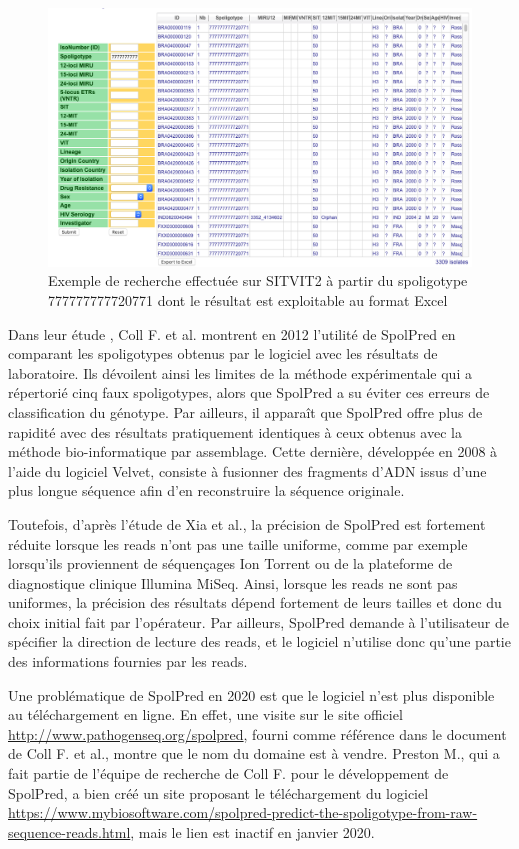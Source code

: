 \documentclass[twoside,a4paper,11pt,frenchb,openany]{report}
\begin{document}
\begin{figure}[h!]
\centering
\includegraphics[scale=0.44]{spol.png}
\caption{Exemple de recherche effectuée sur SITVIT2 à partir du spoligotype 777777777720771 dont le résultat est exploitable au format Excel}
\end{figure}

Dans leur étude \cite{coll}, Coll F. et al. montrent en 2012 l'utilité de SpolPred en comparant les spoligotypes obtenus par le logiciel avec les résultats de laboratoire. Ils dévoilent ainsi les limites de la méthode expérimentale qui a répertorié cinq faux spoligotypes, alors que SpolPred a su éviter ces erreurs de classification du génotype. Par ailleurs, il apparaît que SpolPred offre plus de rapidité avec des résultats pratiquement identiques à ceux obtenus avec la méthode bio-informatique par assemblage. Cette dernière, développée en 2008 à l'aide du logiciel Velvet, consiste à fusionner des fragments d'ADN issus d'une plus longue séquence afin d'en reconstruire la séquence originale.

Toutefois, d'après l'étude de Xia et al.\cite{xia}, la précision de SpolPred est fortement réduite lorsque les reads n'ont pas une taille uniforme, comme par exemple lorsqu'ils proviennent de séquençages Ion Torrent ou de la plateforme de diagnostique clinique Illumina MiSeq. Ainsi, lorsque les reads ne sont pas uniformes, la précision des résultats dépend fortement de leurs tailles et donc du choix initial fait par l'opérateur. Par ailleurs, SpolPred demande à l'utilisateur de spécifier la direction de lecture des reads, et le logiciel n'utilise donc qu'une partie des informations fournies par les reads.

Une problématique de SpolPred en 2020 est que le logiciel n'est plus disponible au téléchargement en ligne. En effet, une visite sur le site officiel \url{http://www.pathogenseq.org/spolpred}, fourni comme référence dans le document \cite{coll} de Coll F. et al., montre que le nom du domaine est à vendre. Preston M., qui a fait partie de l'équipe de recherche de Coll F. pour le développement de SpolPred, a bien créé un site proposant le téléchargement du logiciel \url{https://www.mybiosoftware.com/spolpred-predict-the-spoligotype-from-raw-sequence-reads.html}, mais le lien est inactif en janvier 2020.
\end{document}
